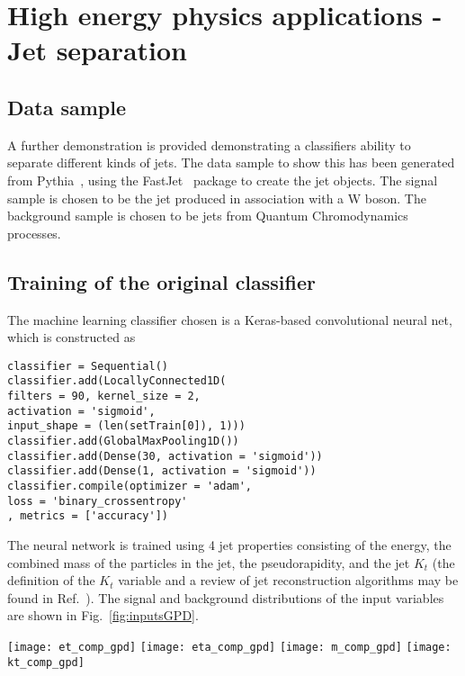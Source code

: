 \section{High energy physics applications - Jet separation}
\label{sec:hepGPD}

\subsection{Data sample}

A further demonstration is provided demonstrating a classifiers ability to separate different
kinds of jets. The data sample to show this has been generated from Pythia~\cite{Sjostrand:2007gs}, using the FastJet~\cite{Cacciari:2011ma} package
to create the jet objects. 
The signal sample is chosen to be the jet produced in association with a W boson.
The background sample is chosen to be jets from Quantum Chromodynamics processes.

\subsection{Training of the original classifier}

The machine learning classifier chosen is a Keras-based convolutional neural net,
which is constructed as
\begin{lstlisting}
classifier = Sequential()
classifier.add(LocallyConnected1D(
filters = 90, kernel_size = 2, 
activation = 'sigmoid', 
input_shape = (len(setTrain[0]), 1)))
classifier.add(GlobalMaxPooling1D())
classifier.add(Dense(30, activation = 'sigmoid'))
classifier.add(Dense(1, activation = 'sigmoid'))
classifier.compile(optimizer = 'adam', 
loss = 'binary_crossentropy'
, metrics = ['accuracy'])
\end{lstlisting}

The neural network is trained using 4 jet properties consisting of the energy,
the combined mass of the particles in the jet, the pseudorapidity, and the jet $K_t$ (the definition 
of the $K_t$ variable and a review of jet reconstruction algorithms
may be found in Ref.~\cite{Atkin:2015msa}).
The signal and background distributions of the input variables
are shown in Fig.~\ref{fig:inputsGPD}.
%
\begin{figure*}[t]
\centering
\texttt{[image: et\_comp\_gpd]}
\texttt{[image: eta\_comp\_gpd]}
\texttt{[image: m\_comp\_gpd]}
\texttt{[image: kt\_comp\_gpd]}
\caption{\small Comparison of the signal and background distributions
used to train the Keras classifier .}
\label{fig:inputsGPD}
\end{figure*}

